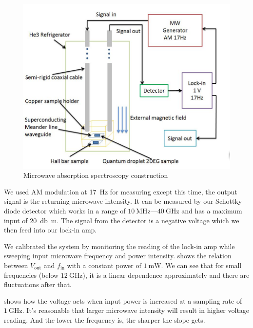 \documentclass[12pt]{ruthesis}
\begin{document}
\begin{figure}
  \centering
  \includegraphics[scale=0.25]{figures/configuration.JPG}
  \caption{Microwave absorption spectroscopy construction}
  \label{configuration}
\end{figure}
 
We used AM modulation at \SI{17}{\hertz} for measuring except this time, the output signal is the returning microwave intensity. It can be measured by our Schottky diode detector which works in a range of $\SI{10}{\mega \hertz}$---$\SI{40}{\giga \hertz}$ and has a maximum input of \SI{20}{\decibel\meter}. 
The signal from the detector is a negative voltage which we then feed into our lock-in amp.

We calibrated the system by monitoring the reading of the lock-in amp while sweeping input microwave frequency and power intensity.
 shows the relation between $V_{\mathrm{out}}$ and $f_{\mathrm{in}}$ with a constant power of $\SI{1}{\milli \watt}$. We can see that for small frequencies (below $\SI{12}{\giga \hertz}$), it is a linear dependence approximately and there are fluctuations after that.



 shows how the voltage acts when input power is increased at a sampling rate of $\SI{1}{\giga \hertz}$. It's reasonable that larger microwave intensity will result in higher voltage reading. And the lower the frequency is, the sharper the slope gets. 
\end{document}
